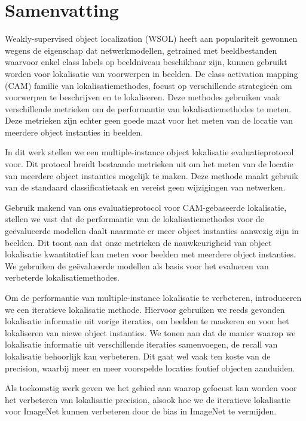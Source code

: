 \chapter*{Samenvatting}

Weakly-supervised object localization (WSOL) heeft aan populariteit gewonnen wegens de eigenschap dat netwerkmodellen, getrained met beeldbestanden waarvoor enkel class labels op beeldniveau beschikbaar zijn, kunnen gebruikt worden voor lokalisatie van voorwerpen in beelden. De class activation mapping (CAM) familie van lokalisatiemethodes, focust op verschillende strategieën om voorwerpen te beschrijven en te lokaliseren. Deze methodes gebruiken vaak verschillende metrieken om de performantie van lokalisatiemethodes te meten. Deze metrieken zijn echter geen goede maat voor het meten van de locatie van meerdere object instanties in beelden.

In dit werk stellen we een multiple-instance object lokalisatie evaluatieprotocol voor. Dit protocol breidt bestaande metrieken uit om het meten van de locatie van meerdere object instanties mogelijk te maken. Deze methode maakt gebruik van de standaard classificatietaak en vereist geen wijzigingen van netwerken.

Gebruik makend van ons evaluatieprotocol voor CAM-gebaseerde lokalisatie, stellen we vast dat de performantie van de lokalisatiemethodes voor de geëvalueerde modellen daalt naarmate er meer object instanties aanwezig zijn in beelden. Dit toont aan dat onze metrieken de nauwkeurigheid van object lokalisatie kwantitatief kan meten voor beelden met meerdere object instanties. We gebruiken de geëvalueerde modellen als basis voor het evalueren van verbeterde lokalisatiemethodes.

Om de performantie van multiple-instance lokalisatie te verbeteren, introduceren we een iteratieve lokalisatie methode. Hiervoor gebruiken we reeds gevonden lokalisatie informatie uit vorige iteraties, om beelden te maskeren en voor het lokaliseren van niewe object instanties. We tonen aan dat de manier waarop we lokalisatie informatie uit verschillende iteraties samenvoegen, de recall van lokalisatie behoorlijk kan verbeteren. Dit gaat wel vaak ten koste van de precision, waarbij meer en meer voorspelde locaties foutief objecten aanduiden. 

Als toekomstig werk geven we het gebied aan waarop gefocust kan worden voor het verbeteren van lokalisatie precision, alsook hoe we de iteratieve lokalisatie voor ImageNet kunnen verbeteren door de bias in ImageNet te vermijden.